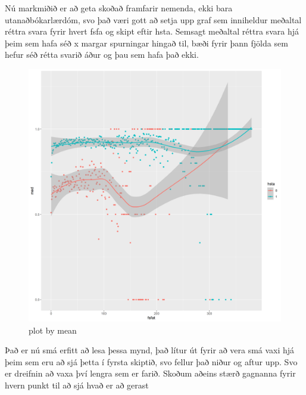 \documentclass[
]{article}
\begin{document}
Nú markmiðið er að geta skoðað framfarir nemenda, ekki bara utanaðbókarlærdóm, svo það væri gott að setja upp graf sem inniheldur meðaltal réttra svara fyrir hvert fsfa og skipt eftir hsta. Semsagt meðaltal réttra svara hjá þeim sem hafa séð x margar spurningar hingað til, bæði fyrir þann fjölda sem hefur séð rétta svarið áður og þau sem hafa það ekki.

\begin{figure}
\centering
\includegraphics{Imgsimplify/plotbymean.png}
\caption{plot by mean}
\end{figure}

Það er nú smá erfitt að lesa þessa mynd, það lítur út fyrir að vera smá vaxi hjá þeim sem eru að sjá þetta í fyrsta skiptið, svo fellur það niður og aftur upp. Svo er dreifnin að vaxa því lengra sem er farið. Skoðum aðeins stærð gagnanna fyrir hvern punkt til að sjá hvað er að gerast
\end{document}
